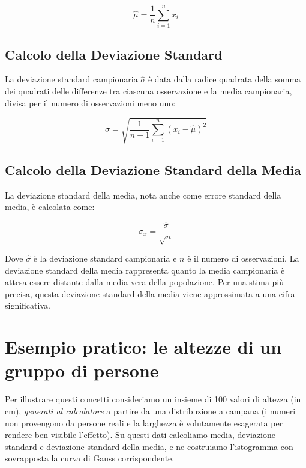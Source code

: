 \begin{equation}
\hat{\mu} = \frac{1}{n} \sum_{i=1}^{n} x_i
\end{equation}

\subsection{Calcolo della Deviazione Standard}
La deviazione standard campionaria $\hat{\sigma}$ è data dalla radice quadrata della somma dei quadrati delle differenze tra ciascuna osservazione e la media campionaria, divisa per il numero di osservazioni meno uno:

\begin{equation}
\hat{\sigma} = \sqrt{\frac{1}{n-1} \sum_{i=1}^{n} (x_i - \hat{\mu})^2}
\end{equation}

\subsection{Calcolo della Deviazione Standard della Media}
La deviazione standard della media, nota anche come errore standard della media, è calcolata come:

\begin{equation}
\sigma_{\overline{x}} = \frac{\hat{\sigma}}{\sqrt{n}}
\end{equation}

Dove $\hat{\sigma}$ è la deviazione standard campionaria e $n$ è il numero di osservazioni. La deviazione standard della media rappresenta quanto la media campionaria è attesa essere distante dalla media vera della popolazione. Per una stima più precisa, questa deviazione standard della media viene approssimata a una cifra significativa.

\section{Esempio pratico: le altezze di un gruppo di persone}
Per illustrare questi concetti consideriamo un insieme di 100 valori di altezza (in cm), \emph{generati al calcolatore} a partire da una distribuzione a campana (i numeri non provengono da persone reali e la larghezza è volutamente esagerata per rendere ben visibile l'effetto). Su questi dati calcoliamo media, deviazione standard e deviazione standard della media, e ne costruiamo l'istogramma con sovrapposta la curva di Gauss corrispondente.

